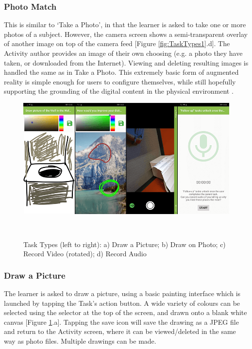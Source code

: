 \subsubsection*{Photo Match}
This is similar to `Take a Photo', in that the learner is asked to take one or more photos of a subject. However, the camera screen shows a semi-transparent overlay of another image on top of the camera feed [Figure \ref{fig:TaskTypes1}.d]. The Activity author provides an image of their own choosing (e.g. a photo they have taken, or downloaded from the Internet). Viewing and deleting resulting images is handled the same as in Take a Photo. This extremely basic form of augmented reality is simple enough for users to configure themselves, while still hopefully supporting the grounding of the digital content in the physical environment \citep{javornik2019}. 

\begin{figure}
  \centering
  \includegraphics[width=1\columnwidth]{images/chapter05/tasktypes2.png}
  \caption[Task Types (part 2)]{Task Types (left to right): a) Draw a Picture; b) Draw on Photo; c) Record Video (rotated); d) Record Audio}~\label{fig:TaskTypes2}
\end{figure}

\subsubsection*{Draw a Picture}
The learner is asked to draw a picture, using a basic painting interface which is launched by tapping the Task's action button. A wide variety of colours can be selected using the selector at the top of the screen, and drawn onto a blank white canvas [Figure \ref{fig:TaskTypes2}.a]. Tapping the save icon will save the drawing as a JPEG file and return to the Activity screen, where it can be viewed/deleted in the same way as photo files. Multiple drawings can be made.

